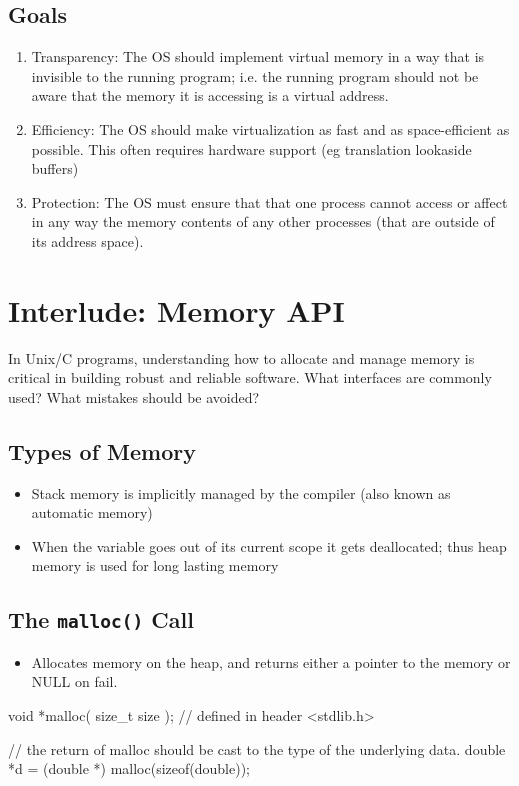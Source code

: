 \documentclass[11pt, a4paper]{article}
\theoremstyle{definition}
\theoremstyle{remark}
\newcommand{\chap}[2]{%
  \renewcommand{\thesection}{\arabic{section}}%
  \renewcommand{\theHsection}{chap.\arabic{section}}%
  \setcounter{section}{#1}\addtocounter{section}{-1}%
  \section{#2}}
\begin{document}
\subsection{Goals}
\begin{enumerate}
  \item Transparency: The OS should implement virtual memory in a way that is invisible to the running program; i.e. the running program should not be aware that the memory it is accessing is a virtual address.
  \item Efficiency: The OS should make virtualization as fast and as space-efficient as possible. This often requires hardware support (eg translation lookaside buffers)
  \item Protection: The OS must ensure that that one process cannot access or affect in any way the memory contents of any other processes (that are outside of its address space).
\end{enumerate}
\chap{14}{Interlude: Memory API}
In Unix/C programs, understanding how to allocate and manage memory is critical in building robust and reliable software. What interfaces are commonly used? What mistakes should be avoided?
\subsection{Types of Memory}
\begin{itemize}
  \item Stack memory is implicitly managed by the compiler (also known as automatic memory)
  \item When the variable goes out of its current scope it gets deallocated; thus heap memory is used for long lasting memory
\end{itemize}
\subsection{The \texttt{malloc()} Call}
\begin{itemize}
  \item Allocates memory on the heap, and returns either a pointer to the memory or NULL on fail. 
\end{itemize}
\begin{ccode}
void *malloc( size_t size ); // defined in header <stdlib.h>

// the return of malloc should be cast to the type of the underlying data.
double *d = (double *) malloc(sizeof(double));
\end{ccode}
\end{document}
